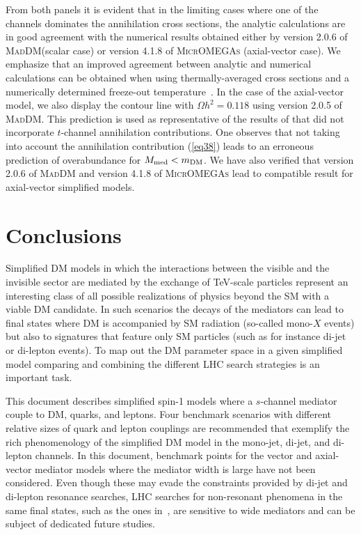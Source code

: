 \documentclass[a4paper, 11pt,notoc]{article}
\newcommand{\maddm}{\textsc{MadDM}\xspace}
\begin{document}
From both panels it is evident that in the limiting cases where one of the channels dominates the annihilation cross sections, the analytic calculations are in good agreement with the numerical results obtained either by version 2.0.6 of \maddm (scalar case) or version 4.1.8 of \textsc{MicrOMEGAs} (axial-vector case). We emphasize that an improved agreement between analytic and numerical calculations can be obtained when using thermally-averaged cross sections and a numerically determined freeze-out temperature~\cite{Gondolo:1990dk}. In the case of the axial-vector model, we also display the contour line with $\Omega h^2 = 0.118$ using version 2.0.5 of \maddm. This prediction is used as representative of the results of \cite{Pree:2016hwc} that did not incorporate $t$-channel annihilation contributions. One observes that not taking into account the annihilation  contribution (\ref{eq38}) leads to an erroneous prediction of overabundance for $M_{\rm med} < m_{\rm DM}$. We have also verified that version 2.0.6 of \maddm and version 4.1.8 of \textsc{MicrOMEGAs} lead to compatible result for axial-vector simplified models. 


\section{Conclusions}

Simplified DM models in which the interactions between the visible and the invisible sector are mediated by the exchange of TeV-scale particles represent an interesting class of all  possible realizations of physics beyond the SM with a  viable DM candidate. In such scenarios the decays of the mediators can lead to final states where DM is  accompanied by SM radiation (so-called mono-$X$ events) but also to signatures that feature only SM particles (such as for instance di-jet or di-lepton events). To map out the DM parameter space in a given simplified model comparing and combining the different LHC search strategies is an important task. 

This document describes simplified spin-1 models where a $s$-channel mediator couple to DM, quarks, and leptons. Four benchmark scenarios with  different relative sizes of quark and lepton couplings are recommended that exemplify the rich phenomenology of the simplified DM model in the mono-jet, di-jet, and di-lepton channels. In this document, benchmark points for the vector and axial-vector mediator models where the mediator width is large have not been considered. Even though these may evade the constraints provided by di-jet and di-lepton resonance searches, LHC searches for non-resonant phenomena in the same final states, such as the ones in~\cite{ATLAS:2015nsi,Sirunyan:2017ygf,Aad:2014wca, Khachatryan:2015scf}, are sensitive to wide mediators and can be subject of dedicated future studies.
\end{document}
